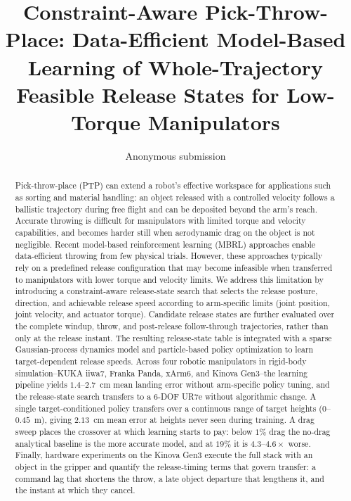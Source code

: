 \documentclass[letterpaper, 10 pt, conference]{ieeeconf}
\title{\LARGE \bf
Constraint-Aware Pick-Throw-Place:
Data-Efficient Model-Based Learning of Whole-Trajectory Feasible
Release States for Low-Torque Manipulators
}
\author{Anonymous submission}
\begin{document}
\maketitle

\begin{abstract}
Pick-throw-place (PTP) can extend a robot's effective workspace for applications such as sorting and material handling: an object released with a controlled velocity follows a ballistic trajectory during free flight and can be deposited beyond the arm's reach. Accurate throwing is difficult for manipulators with limited torque and velocity capabilities, and becomes harder still when aerodynamic drag on the object is not negligible. Recent model-based reinforcement learning (MBRL) approaches enable data-efficient throwing from few physical trials. However, these approaches typically rely on a predefined release configuration that may become infeasible when transferred to manipulators with lower torque and velocity limits. We address this limitation by introducing a constraint-aware release-state search that selects the release posture, direction, and achievable release speed according to arm-specific limits (joint position, joint velocity, and actuator torque). Candidate release states are further evaluated over the complete windup, throw, and post-release follow-through trajectories, rather than only at the release instant. The resulting release-state table is integrated with a sparse Gaussian-process dynamics model and particle-based policy optimization to learn target-dependent release speeds. Across four robotic manipulators in rigid-body simulation--KUKA iiwa7, Franka Panda, xArm6, and Kinova Gen3--the learning pipeline yields $1.4$--$2.7$~cm mean landing error without arm-specific policy tuning, and the release-state search transfers to a 6-DOF UR7e without algorithmic change. A single target-conditioned policy transfers over a continuous range of target heights ($0$--$0.45$~m), giving $2.13$~cm mean error at heights never seen during training. A drag sweep places the crossover at which learning starts to pay: below $1\%$ drag the no-drag analytical baseline is the more accurate model, and at $19\%$ it is $4.3$--$4.6\times$ worse. Finally, hardware experiments on the Kinova Gen3 execute the full stack with an object in the gripper and quantify the release-timing terms that govern transfer: a command lag that shortens the throw, a late object departure that lengthens it, and the instant at which they cancel.
\end{abstract}
\end{document}
